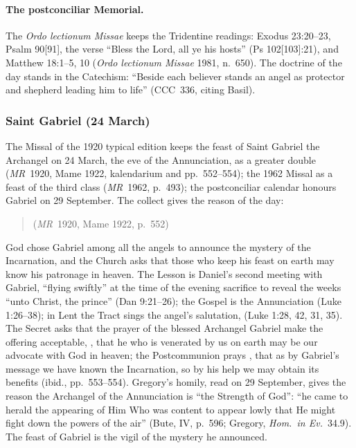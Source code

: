 \paragraph{The postconciliar Memorial.} The \emph{Ordo lectionum Missae}
keeps the Tridentine readings: Exodus 23:20--23, Psalm 90[91], the verse
``Bless the Lord, all ye his hosts'' (Ps 102[103]:21), and Matthew
18:1--5, 10 (\emph{Ordo lectionum Missae} 1981, n.~650). The doctrine of
the day stands in the Catechism: ``Beside each believer stands an angel as
protector and shepherd leading him to life'' (CCC~336, citing Basil).

\subsubsection{Saint Gabriel (24 March)}

The Missal of the 1920 typical edition keeps the feast of Saint Gabriel
the Archangel on 24 March, the eve of the Annunciation, as a greater
double (\emph{MR}~1920, Mame 1922, kalendarium and pp.~552--554); the 1962
Missal as a feast of the third class (\emph{MR}~1962, p.~493); the
postconciliar calendar honours Gabriel on 29 September. The collect gives
the reason of the day:
\begin{quote}
(\emph{MR}~1920, Mame 1922, p.~552)
\end{quote}
God chose Gabriel among all the angels to announce the mystery of the
Incarnation, and the Church asks that those who keep his feast on earth
may know his patronage in heaven. The Lesson is Daniel's second meeting
with Gabriel, ``flying swiftly'' at the time of the evening sacrifice to
reveal the weeks ``unto Christ, the prince'' (Dan 9:21--26); the
Gospel is the Annunciation (Luke 1:26--38); in Lent the Tract sings the
angel's salutation, 
(Luke 1:28, 42, 31, 35). The Secret asks that the prayer of the blessed
Archangel Gabriel make the offering acceptable, , that he
who is venerated by us on earth may be our advocate with God in heaven;
the Postcommunion prays , that as by Gabriel's message we have known the
Incarnation, so by his help we may obtain its benefits (ibid.,
pp.~553--554). Gregory's homily, read on 29 September, gives the reason
the Archangel of the Annunciation is ``the Strength of God'': ``he came
to herald the appearing of Him Who was content to appear lowly that He
might fight down the powers of the air'' (Bute, IV, p.~596; Gregory,
\emph{Hom.\ in Ev.}\ 34.9). The feast of Gabriel is the vigil of the mystery he
announced.


